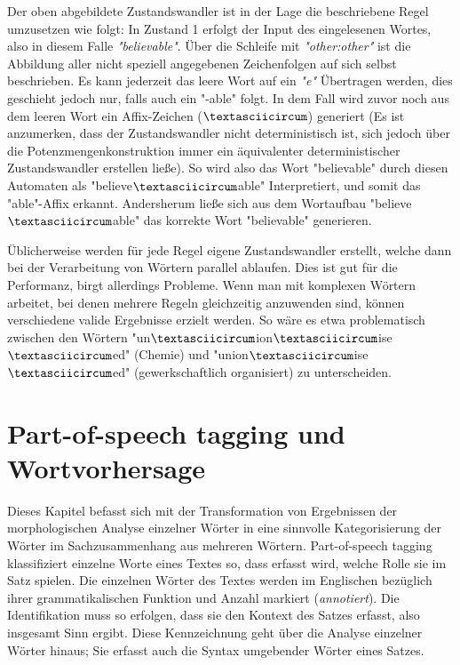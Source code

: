\documentclass[12pt]{report}
\begin{document}
Der oben abgebildete Zustandswandler ist in der Lage die beschriebene Regel umzusetzen wie folgt: In Zustand 1 erfolgt der Input des eingelesenen Wortes, also in diesem Falle \textit{"believable"}. Über die Schleife mit \textit{"other:other"} ist die Abbildung aller nicht speziell angegebenen Zeichenfolgen auf sich selbst beschrieben. Es kann jederzeit das leere Wort auf ein \textit{"e"} Übertragen werden, dies geschieht jedoch nur, falls auch ein "-able" folgt. In dem Fall wird zuvor noch aus dem leeren Wort ein Affix-Zeichen ($\textasciicircum$) generiert (Es ist anzumerken, dass der Zustandswandler nicht deterministisch ist, sich jedoch über die Potenzmengenkonstruktion immer ein äquivalenter deterministischer Zustandswandler erstellen ließe). So wird also das Wort "believable" durch diesen Automaten als "believe$\textasciicircum$able" Interpretiert, und somit das "able"-Affix erkannt. Andersherum ließe sich aus dem Wortaufbau "believe$\textasciicircum$able" das korrekte Wort "believable" generieren.

Üblicherweise werden für jede Regel eigene Zustandswandler erstellt, welche dann bei der Verarbeitung von Wörtern parallel ablaufen. Dies ist gut für die Performanz, birgt allerdings Probleme. Wenn man mit komplexen Wörtern arbeitet, bei denen mehrere Regeln gleichzeitig anzuwenden sind, können verschiedene valide Ergebnisse erzielt werden. So wäre es etwa problematisch zwischen den Wörtern "un$\textasciicircum$ion$\textasciicircum$ise$\textasciicircum$ed" (Chemie) und "union$\textasciicircum$ise$\textasciicircum$ed" (gewerkschaftlich organisiert) zu unterscheiden. 

\section{Part-of-speech tagging und Wortvorhersage}
Dieses Kapitel befasst sich mit der Transformation von Ergebnissen der morphologischen Analyse einzelner Wörter in eine sinnvolle Kategorisierung der Wörter im Sachzusammenhang aus mehreren Wörtern. Part-of-speech tagging klassifiziert einzelne Worte eines Textes so, dass erfasst wird, welche Rolle sie im Satz spielen. Die einzelnen Wörter des Textes werden im Englischen bezüglich ihrer grammatikalischen Funktion und Anzahl markiert (\textit{annotiert}). Die Identifikation muss so erfolgen, dass sie den Kontext des Satzes erfasst, also insgesamt Sinn ergibt. Diese Kennzeichnung geht über die Analyse einzelner Wörter hinaus; Sie erfasst auch die Syntax umgebender Wörter eines Satzes. 
\end{document}
